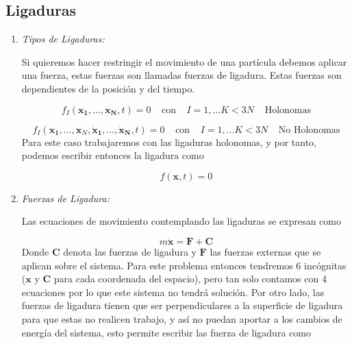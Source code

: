 \subsection[short]{Ligaduras}
    \begin{enumerate}
        \item \textit{Tipos de Ligaduras:}
            
            Si quieremos hacer restringir el movimiento de una partícula debemos aplicar una fuerza, estas fuerzas son llamadas fuerzas de ligadura. Estas fuerzas son dependientes de la posición y del tiempo.

            \begin{equation*}
                f_I (\mathbf{x_1}, \dots, \mathbf{x_N},t) = 0 \;\;\;\; \text{con} \;\;\;\; I = 1, \dots K < 3N \;\;\;\;\text{Holonomas}
            \end{equation*}

            \begin{equation*}
                f_I (\mathbf{x_1}, \dots, \mathbf{x}_N,\mathbf{\dot{x}_1}, \dots, \mathbf{\dot{x}_N},t) = 0 \;\;\;\; \text{con} \;\;\;\; I = 1, \dots K < 3N \;\;\;\;\text{No Holonomas}
            \end{equation*}
            Para este caso trabajaremos con las ligaduras holonomas, y por tanto, podemos escribir entonces la ligadura como

            \begin{equation*}
                f(\mathbf{x},t) = 0
            \end{equation*}

        \item \textit{Fuerzas de Ligadura:}

            Las ecuaciones de movimiento contemplando las ligaduras se expresan como

            \begin{equation*}
                m\ddot{\mathbf{x}} = \mathbf{F} + \mathbf{C}
            \end{equation*}
            Donde $\mathbf{C}$ denota las fuerzas de ligadura y $\mathbf{F}$ las fuerzas externas que se aplican sobre el sistema. Para este problema entonces tendremos 6 incógnitas ($\mathbf{x}$ y $\mathbf{C}$ para cada coordenada del espacio), pero tan solo contamos con 4 ecuaciones por lo que este sistema no tendrá solución. Por otro lado, las fuerzas de ligadura tienen que ser perpendiculares a la superficie de ligadura para que estas no realicen trabajo, y así no puedan aportar a los cambios de energía del sistema, esto permite escribir las fuerza de ligadura como


\end{enumerate}
